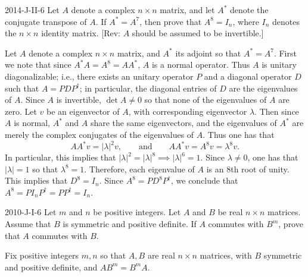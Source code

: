 \documentclass{article}
\begin{document}
	\begin{prb}{2014-J-II-6}
		Let $A$ denote a complex $n \times n$ matrix, and let $A^{\ast}$ denote the conjugate transpose of $A$. If $A^{\ast} = A^{7}$, then prove that $A^{8} = I_{n}$, where $I_{n}$ denotes the $n\times n$ identity matrix. [Rev: $A$ should be assumed to be invertible.]
	\end{prb}
	Let $A$ denote a complex $n \times n$ matrix, and $A^{\ast}$ its adjoint so that $A^{\ast} = A^{7}$. First we note that since $A^{\ast}A = A^{8} = AA^{\ast}$, $A$ is a normal operator. Thus $A$ is unitary diagonalizable; i.e., there exists an unitary operator $P$ and a diagonal operator $D$ such that $A = PDP^{\dagger}$; in particular, the diagonal entries of $D$ are the eigenvalues of $A$. Since $A$ is invertible, $\det{A} \neq 0$ so that none of the eigenvalues of $A$ are zero. Let $v$ be an eigenvector of $A$, with corresponding eigenvector $\lambda$. Then since $A$ is normal, $A^{\ast}$ and $A$ share the same eigenvectors, and the eigenvalues of $A^{\ast}$ are merely the complex conjugates of the eigenvalues of $A$. Thus one has that 
	\begin{equation*}
		AA^{\ast}v = |\lambda|^2 v, \qquad \text{and} \qquad AA^{\ast}v = A^{8}v = \lambda^{8}v. 
	\end{equation*}
	In particular, this implies that $|\lambda|^2 = |\lambda|^{8} \implies |\lambda|^{6} = 1$. Since $\lambda \neq 0$, one has that $|\lambda| = 1$ so that $\lambda^{8} = 1$. Therefore, each eigenvalue of $A$ is an 8th root of unity. This implies that $D^{8} = I_{n}$. Since $A^{8} = PD^{8}P^{\dagger}$, we conclude that $A^{8} = PI_{n}P^{\dagger} = PP^{\dagger} = I_{n}$. 
	
	\begin{prb}{2010-J-I-6}
		Let $m$ and $n$ be positive integers. Let $A$ and $B$ be real $n \times n$ matrices. Assume that $B$ is symmetric and positive definite. If $A$ commutes with $B^{m}$, prove that $A$ commutes with $B$. 
	\end{prb}
	Fix positive integers $m, n$ so that $A, B$ are real $n \times n$ matrices, with $B$ symmetric and positive definite, and $AB^{m} = B^{m}A$. 
	
\end{document}
